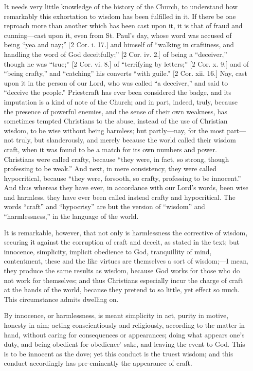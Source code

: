 It needs very little knowledge of the history of the Church, to
understand how remarkably this exhortation to wisdom has been
fulfilled in it. If there be one reproach more than another which has
been cast upon it, it is that of fraud and cunning—cast upon it,
even from St. Paul's day, whose word was accused of being ``yea
and nay;'' [2 Cor. i. 17.] and himself of ``walking in
craftiness, and handling the word of God deceitfully;'' [2 Cor.
iv. 2.] of being a ``deceiver,'' though he was
``true;'' [2 Cor. vi. 8.] of ``terrifying by
letters;'' [2 Cor. x. 9.] and of ``being crafty,'' and
``catching'' his converts ``with guile.'' [2 Cor. xii.
16.] Nay, cast upon it in the person of our Lord, who was called
``a deceiver,'' and said to ``deceive the people.''
Priestcraft has ever been considered the badge, and its imputation is
a kind of note of the Church; and in part, indeed, truly, because the
presence of powerful enemies, and the sense of their own weakness, has
sometimes tempted Christians to the abuse, instead of the use of
Christian wisdom, to be wise without being harmless; but partly—nay,
for the most part—not truly, but slanderously, and merely because
the world called their wisdom craft, when it was found to be a match
for its own numbers and power. Christians were called crafty, because
``they were, in fact, so strong, though professing to be
weak.'' And next, in mere consistency, they were called
hypocritical, because ``they were, forsooth, so crafty, professing
to be innocent.'' And thus whereas they have ever, in accordance
with our Lord's words, been wise and harmless, they have ever been
called instead crafty and hypocritical. The words ``craft''
and ``hypocrisy'' are but the version of ``wisdom''
and ``harmlessness,'' in the language of the world.

It is remarkable, however, that not only is harmlessness the
corrective of wisdom, securing it against the corruption of craft and
deceit, as stated in the text; but innocence, simplicity, implicit
obedience to God, tranquillity of mind, contentment, these and the
like virtues are themselves a sort of wisdom;—I mean, they produce
the same results as wisdom, because God works for those who do not
work for themselves; and thus Christians especially incur the charge
of craft at the hands of the world, because they pretend to so little,
yet effect so much. This circumstance admits dwelling on.

By innocence, or harmlessness, is meant simplicity in act, purity
in motive, honesty in aim; acting conscientiously and religiously,
according to the matter in hand, without caring for consequences or
appearances; doing what appears one's duty, and being obedient for
obedience' sake, and leaving the event to God. This is to be innocent
as the dove; yet this conduct is the truest wisdom; and this conduct
accordingly has pre-eminently the appearance of craft.

